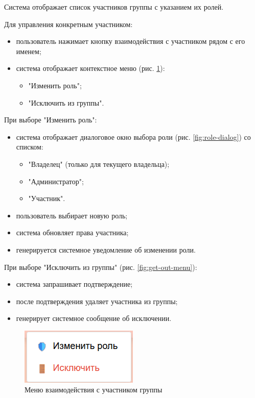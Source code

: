 Система отображает список участников группы с указанием их ролей.

Для управления конкретным участником:
\begin{itemize}
	\item пользователь нажимает кнопку взаимодействия с участником рядом с его именем;
	\item система отображает контекстное меню (рис. \ref{fig:member-menu}):
	\begin{itemize}
		\item "Изменить роль";
		\item "Исключить из группы".
	\end{itemize}
\end{itemize}

При выборе "Изменить роль":
\begin{itemize}
	\item система отображает диалоговое окно выбора роли (рис. \ref{fig:role-dialog}) со списком:
	\begin{itemize}
		\item "Владелец" (только для текущего владельца);
		\item "Администратор";
		\item "Участник".
	\end{itemize}
	\item пользователь выбирает новую роль;
	\item система обновляет права участника;
	\item генерируется системное уведомление об изменении роли.
\end{itemize}

При выборе "Исключить из группы" (рис. \ref{fig:get-out-menu}):
\begin{itemize}
	\item система запрашивает подтверждение;
	\item после подтверждения удаляет участника из группы;
	\item генерирует системное сообщение об исключении.
\end{itemize}

\begin{figure}[h]
	\centering
	\includegraphics[width=0.8\linewidth]{"images/Меню взаимодействия с участником"}
	\caption{Меню взаимодействия с участником группы}
	\label{fig:member-menu}
\end{figure}

